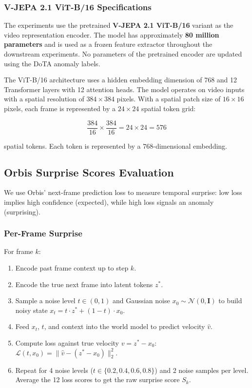 \documentclass{article}
\begin{document}
\subsubsection{V-JEPA 2.1 ViT-B/16 Specifications}

The experiments use the pretrained \textbf{V-JEPA 2.1 ViT-B/16} variant as the video representation encoder. The model has approximately \textbf{80 million parameters} and is used as a frozen feature extractor throughout the downstream experiments. No parameters of the pretrained encoder are updated using the DoTA anomaly labels.

The ViT-B/16 architecture uses a hidden embedding dimension of 768 and 12 Transformer layers with 12 attention heads. The model operates on video inputs with a spatial resolution of $384\times384$ pixels. With a spatial patch size of $16\times16$ pixels, each frame is represented by a $24\times24$ spatial token grid:

\begin{equation}
\frac{384}{16}\times\frac{384}{16}
=
24\times24
=
576
\end{equation}

spatial tokens. Each token is represented by a 768-dimensional embedding.


\subsection{Orbis Surprise Scores Evaluation}
We use Orbis' next-frame prediction loss to measure temporal surprise: low loss implies high confidence (expected), while high loss signals an anomaly (surprising).

\subsubsection{Per-Frame Surprise} 
For frame $k$:
\begin{enumerate}
    \item Encode past frame context up to step $k$.
    \item Encode the true next frame into latent tokens $z^*$.
    \item Sample a noise level $t \in (0, 1)$ and Gaussian noise $x_0 \sim \mathcal{N}(0, \mathbf{I})$ to build noisy state $x_t = t \cdot z^* + (1 - t) \cdot x_0$.
    \item Feed $x_t$, $t$, and context into the world model to predict velocity $\hat{v}$.
    \item Compute loss against true velocity $v = z^* - x_0$: $\mathcal{L}(t, x_0) = \|\hat{v} - (z^* - x_0)\|_2^2$.
    \item Repeat for 4 noise levels ($t \in \{0.2, 0.4, 0.6, 0.8\}$) and 2 noise samples per level. Average the 12 loss scores to get the raw surprise score $S_k$.
\end{enumerate}
\end{document}
